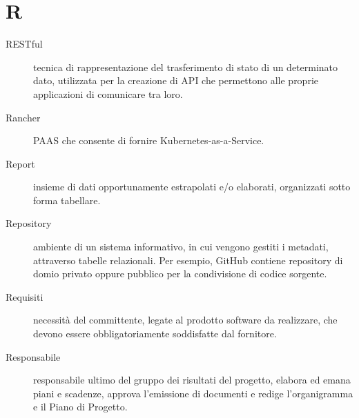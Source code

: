 \documentclass{article}
\begin{document}
\section{R}
\begin{description}
  \item[RESTful] tecnica di rappresentazione del trasferimento di stato di un determinato dato, utilizzata per la creazione di API che permettono alle proprie applicazioni di comunicare tra loro.
  \item[Rancher] PAAS che consente di fornire Kubernetes-as-a-Service.
  \item[Report] insieme di dati opportunamente estrapolati e/o elaborati, organizzati sotto forma tabellare.
  \item[Repository] ambiente di un sistema informativo, in cui vengono gestiti i metadati, attraverso tabelle relazionali. Per esempio, GitHub contiene repository di domio privato oppure pubblico per la condivisione di codice sorgente.
  \item[Requisiti] necessità del committente, legate al prodotto software da realizzare, che devono essere obbligatoriamente soddisfatte dal fornitore.
  \item[Responsabile] responsabile ultimo del gruppo dei risultati del progetto, elabora ed emana piani e scadenze, approva l'emissione di documenti e redige l'organigramma e il Piano di Progetto.
\end{description}
\newpage
\end{document}
